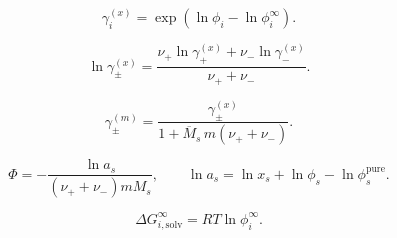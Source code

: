 \documentclass[11pt]{article}
\begin{document}
\begin{equation}
\gamma_i^{(x)}=
\exp\left(\ln\phi_i-\ln\phi_i^\infty\right).
\label{eq:single_ion_activity_coefficient}
\end{equation}

\begin{equation}
\ln\gamma_\pm^{(x)}
=\frac{\nu_+\ln\gamma_+^{(x)}+\nu_-\ln\gamma_-^{(x)}}
{\nu_++\nu_-}.
\label{eq:mean_ionic_activity_coefficient}
\end{equation}

\begin{equation}
\gamma_\pm^{(m)}=
\frac{\gamma_\pm^{(x)}}
{1+\overline M_s\,m(\nu_++\nu_-)}.
\label{eq:molality_activity_conversion}
\end{equation}

\begin{equation}
\Phi=
-\frac{\ln a_s}
{(\nu_++\nu_-)mM_s},
\qquad
\ln a_s=\ln x_s+\ln\phi_s-\ln\phi_s^{\mathrm{pure}}.
\label{eq:practical_osmotic_coefficient}
\end{equation}

\begin{equation}
\Delta G_{i,\mathrm{solv}}^\infty
=RT\ln\phi_i^\infty.
\label{eq:infinite_dilution_solvation_energy}
\end{equation}
\end{document}
